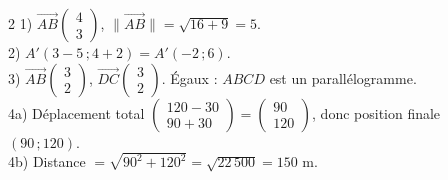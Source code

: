 \begin{multicols}{2}
1) $\vec{AB}\begin{pmatrix}4\\3\end{pmatrix}$, $\|\vec{AB}\|=\sqrt{16+9}=5$.\\
2) $A'(3-5\,;4+2)=A'(-2\,;6)$.\\
3) $\vec{AB}\begin{pmatrix}3\\2\end{pmatrix}$, $\vec{DC}\begin{pmatrix}3\\2\end{pmatrix}$.
Égaux : $ABCD$ est un parallélogramme.\\
4a) Déplacement total $\begin{pmatrix}120-30\\90+30\end{pmatrix}=\begin{pmatrix}90\\120\end{pmatrix}$,
donc position finale $(90\,;120)$.\\
4b) Distance $=\sqrt{90^{2}+120^{2}}=\sqrt{22\,500}=150$ m.

\end{multicols}
\exercicesBanner
